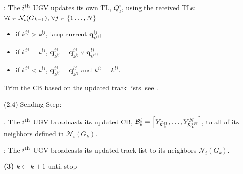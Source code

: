 \begin{algorithm}
\begin{algorithmic}
			\TL: The $i^\text{th}$ UGV updates its own TL, $Q^i_k$, using the received TLs: $\forall l\in \mathcal{N}_i(G_{k-1}),\,\forall j\in \left\lbrace 1\dots,N\right\rbrace$
			\begin{itemize} 
				\item if $k^{ij}>k^{lj}$, keep current $\mathbf{q}^{ij}_{k^{ij}}$;
				\item if $k^{ij}=k^{lj}$, $\mathbf{q}^{ij}_{k^{ij}}=\mathbf{q}^{ij}_{k^{ij}} \lor \mathbf{q}^{lj}_{k^{lj}}$;  
				\item if $k^{ij}<k^{lj}$, $\mathbf{q}^{ij}_{k^{ij}}=\mathbf{q}^{lj}_{k^{lj}}$ and $k^{ij}=k^{lj}$.
			\end{itemize}
			
			Trim the CB based on the updated track lists, see . 
			
			\State (2.4) Sending Step:
			
			\CB: The $i^\text{th}$ UGV broadcasts its updated CB, \small$\mathcal{B}^i_k=\left[Y^1_{\mathcal{K}^{i1}_{k}},\dots,Y^N_{\mathcal{K}^{iN}_{k}}\right]$\normalsize, to all of its neighbors defined in $\mathcal{N}_i(G_k)$.
			
			\TL: The $i^\text{th}$ UGV broadcasts its updated track list to its neighbors $\mathcal{N}_i(G_k)$.
			
			\State \textbf{(3)} $k\leftarrow k+1$ until stop
		\end{algorithmic}
	\end{algorithm}
	
	\medskip
	
